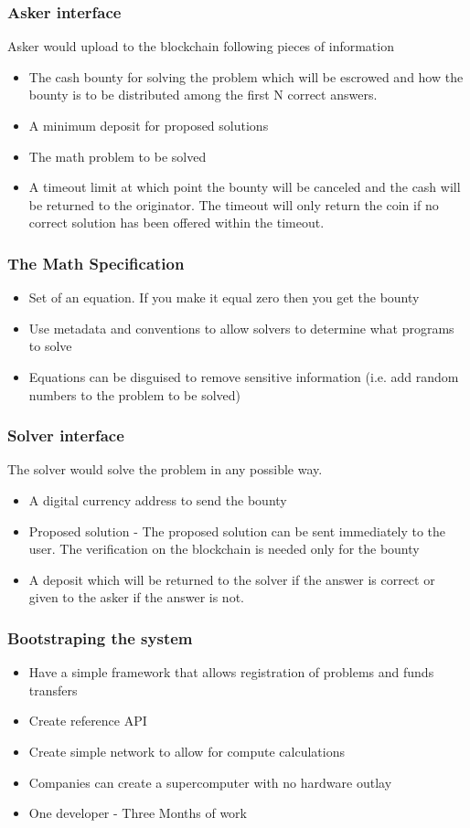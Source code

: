 \documentclass{beamer}
\begin{document}
\begin{frame}
  \frametitle{Asker interface}
  Asker would upload to the blockchain following pieces of information
  \begin{itemize}
  \item The cash bounty for solving the problem which will be
    escrowed and how the bounty is to be distributed among the first
    N correct answers.
  \item A minimum deposit for proposed solutions
  \item The math problem to be solved
  \item A timeout limit at which point the bounty will be canceled
    and the cash will be returned to the originator.  The timeout will
    only return the coin if no correct solution has been offered
    within the timeout.
  \end{itemize}
\end{frame}
\begin{frame}
  \frametitle{The Math Specification}
  \begin{itemize}
    \item Set of an equation.  If you make it equal zero then you get
      the bounty
    \item Use metadata and conventions to allow solvers to determine
      what programs to solve
    \item Equations can be disguised to remove sensitive information
      (i.e. add random numbers to the problem to be solved)
  \end{itemize}
\end{frame}
\begin{frame}
  \frametitle{Solver interface}
The solver would solve the problem in any possible way.
  \begin{itemize}
  \item A digital currency address to send the bounty
  \item Proposed solution - The proposed solution can be sent
    immediately to the user.  The verification on the blockchain is
    needed only for the bounty
  \item A deposit which will be returned to the solver if the answer
    is correct or given to the asker if the answer is not.
  \end{itemize}
\end{frame}
\begin{frame}
  \frametitle{Bootstraping the system}
  \begin{itemize}
    \item Have a simple framework that allows registration of problems and
      funds transfers
    \item Create reference API
    \item Create simple network to allow for compute calculations
    \item Companies can create a supercomputer with no hardware outlay
    \item One developer - Three Months of work
  \end{itemize}
\end{frame}
\end{document}
